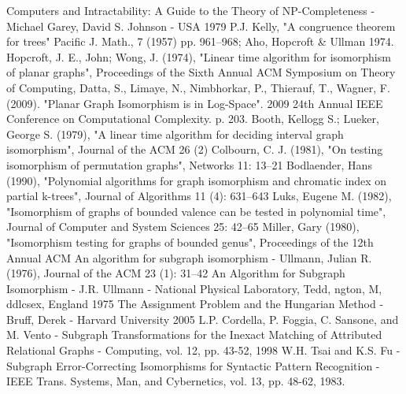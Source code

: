 \documentclass[a4paper,12pt]{article}
\begin{document}
\begin{thebibliography}{1}
 Computers and Intractability: A Guide to the Theory of NP-Completeness - Michael Garey, David S. Johnson - USA 1979
 P.J. Kelly, "A congruence theorem for trees" Pacific J. Math., 7 (1957) pp. 961–968; Aho, Hopcroft & Ullman 1974.
 Hopcroft, J. E., John; Wong, J. (1974), "Linear time algorithm for isomorphism of planar graphs", Proceedings of the Sixth Annual ACM Symposium on Theory of Computing, 
 Datta, S., Limaye, N., Nimbhorkar, P., Thierauf, T., Wagner, F. (2009). "Planar Graph Isomorphism is in Log-Space". 2009 24th Annual IEEE Conference on Computational Complexity. p. 203. 
 Booth, Kellogg S.; Lueker, George S. (1979), "A linear time algorithm for deciding interval graph isomorphism", Journal of the ACM 26 (2)
 Colbourn, C. J. (1981), "On testing isomorphism of permutation graphs", Networks 11: 13–21
 Bodlaender, Hans (1990), "Polynomial algorithms for graph isomorphism and chromatic index on partial k-trees", Journal of Algorithms 11 (4): 631–643
 Luks, Eugene M. (1982), "Isomorphism of graphs of bounded valence can be tested in polynomial time", Journal of Computer and System Sciences 25: 42–65
 Miller, Gary (1980), "Isomorphism testing for graphs of bounded genus", Proceedings of the 12th Annual ACM
 An algorithm for subgraph isomorphism - Ullmann, Julian R. (1976), Journal of the ACM 23 (1): 31–42
 An Algorithm for Subgraph Isomorphism - J.R. Ullmann - National Physical Laboratory, Tedd, ngton, M, ddlcsex, England 1975
 The Assignment Problem and the Hungarian Method - Bruff, Derek - Harvard University 2005
 L.P. Cordella, P. Foggia, C. Sansone, and M. Vento - Subgraph Transformations for the Inexact Matching of Attributed Relational Graphs - Computing, vol. 12, pp. 43-52, 1998
 W.H. Tsai and K.S. Fu - Subgraph Error-Correcting Isomorphisms for Syntactic Pattern Recognition - IEEE Trans. Systems, Man, and Cybernetics, vol. 13, pp. 48-62, 1983.
\end{thebibliography}

\newpage

\listoffigures

\newpage

\renewcommand*{\lstlistlistingname}{Spis listingów}
\lstlistoflistings
\end{document}
